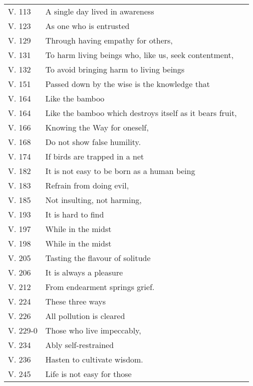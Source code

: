 {\begin{longtable}[c]{llr}
V. 113 & A single day lived in awareness & \pageref{dhp-113}\\
V. 123 & As one who is entrusted & \pageref{dhp-123}\\
V. 129 & Through having empathy for others, & \pageref{dhp-129}\\
V. 131 & To harm living beings who, like us, seek contentment, & \pageref{dhp-131}\\
V. 132 & To avoid bringing harm to living beings & \pageref{dhp-132}\\
V. 151 & Passed down by the wise is the knowledge that & \pageref{dhp-151}\\
V. 164 & Like the bamboo & \pageref{dhp-164}\\
V. 164 & Like the bamboo which destroys itself as it bears fruit, & \pageref{dhp-164}\\
V. 166 & Knowing the Way for oneself, & \pageref{dhp-166}\\
V. 168 & Do not show false humility. & \pageref{dhp-168}\\
V. 174 & If birds are trapped in a net & \pageref{dhp-174}\\
V. 182 & It is not easy to be born as a human being & \pageref{dhp-182}\\
V. 183 & Refrain from doing evil, & \pageref{dhp-183}\\
V. 185 & Not insulting, not harming, & \pageref{dhp-185}\\
V. 193 & It is hard to find & \pageref{dhp-193}\\
V. 197 & While in the midst & \pageref{dhp-197}\\
V. 198 & While in the midst & \pageref{dhp-198}\\
V. 205 & Tasting the flavour of solitude & \pageref{dhp-205}\\
V. 206 & It is always a pleasure & \pageref{dhp-206}\\
V. 212 & From endearment springs grief. & \pageref{dhp-212}\\
V. 224 & These three ways & \pageref{dhp-224}\\
V. 226 & All pollution is cleared & \pageref{dhp-226}\\
V. 229-0 & Those who live impeccably, & \pageref{dhp-229}\\
V. 234 & Ably self-restrained & \pageref{dhp-234}\\
V. 236 & Hasten to cultivate wisdom. & \pageref{dhp-236}\\
V. 245 & Life is not easy for those & \pageref{dhp-245}\\

\end{longtable}}
